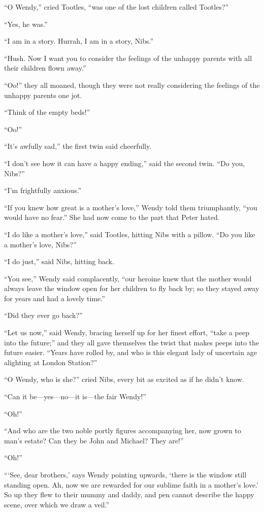 ``O Wendy,'' cried Tootles, ``was one of the lost children called
Tootles?''

``Yes, he was.''

``I am in a story. Hurrah, I am in a story, Nibs.''

``Hush. Now I want you to consider the feelings of the unhappy parents
with all their children flown away.''

``Oo!'' they all moaned, though they were not really considering the
feelings of the unhappy parents one jot.

``Think of the empty beds!''

``Oo!''

``It's awfully sad,'' the first twin said cheerfully.

``I don't see how it can have a happy ending,'' said the second twin. ``Do
you, Nibs?''

``I'm frightfully anxious.''

``If you knew how great is a mother's love,'' Wendy told them
triumphantly, ``you would have no fear.'' She had now come to the part
that Peter hated.

``I do like a mother's love,'' said Tootles, hitting Nibs with a pillow.
``Do you like a mother's love, Nibs?''

``I do just,'' said Nibs, hitting back.

``You see,'' Wendy said complacently, ``our heroine knew that the mother
would always leave the window open for her children to fly back by; so
they stayed away for years and had a lovely time.''

``Did they ever go back?''

``Let us now,'' said Wendy, bracing herself up for her finest effort,
``take a peep into the future;'' and they all gave themselves the twist
that makes peeps into the future easier. ``Years have rolled by, and who
is this elegant lady of uncertain age alighting at London Station?''

``O Wendy, who is she?'' cried Nibs, every bit as excited as if he didn't
know.

``Can it be—yes—no—it is—the fair Wendy!''

``Oh!''

``And who are the two noble portly figures accompanying her, now grown
to man's estate? Can they be John and Michael? They are!''

``Oh!''

``‘See, dear brothers,' says Wendy pointing upwards, ‘there is the
window still standing open. Ah, now we are rewarded for our sublime
faith in a mother's love.' So up they flew to their mummy and daddy,
and pen cannot describe the happy scene, over which we draw a veil.''

